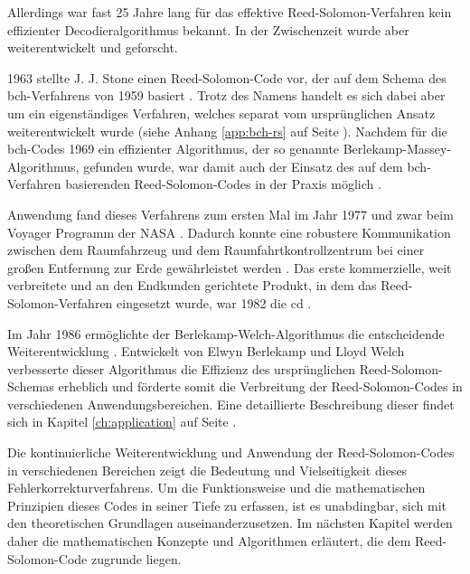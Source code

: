 Allerdings war fast 25 Jahre lang für das effektive Reed-Solomon-Verfahren kein effizienter Decodier\-algorithmus bekannt.
In der Zwischenzeit wurde aber weiterentwickelt und geforscht.

1963 stellte J. J. Stone einen Reed-Solomon-Code vor, der auf dem Schema des \acrfull{bch}-Verfahrens von 1959 basiert \cite{stoneMultipleBurstErrorCorrection1963}.
Trotz des Namens handelt es sich dabei aber um ein eigenständiges Verfahren, welches separat vom ursprünglichen Ansatz weiterentwickelt wurde (siehe Anhang \ref{app:bch-rs} auf Seite \pageref{app:bch-rs}).
Nachdem für die \acrshort{bch}-Codes 1969 ein effizienter Algorithmus, der so genannte Berlekamp-Massey-Algorithmus, gefunden wurde, war damit auch der Einsatz des auf dem \acrshort{bch}-Verfahren basierenden Reed-Solomon-Codes in der Praxis möglich \cite{berlekampNonbinaryBCHDecoding1968, masseyShiftregisterSynthesisBCH1969}.

Anwendung fand dieses Verfahrens zum ersten Mal im Jahr 1977 und zwar beim Voyager Programm der NASA \cite[Kapitel 3.3]{wickerReedSolomonCodes1994}. 
Dadurch konnte eine robustere Kommunikation zwischen dem Raumfahrzeug und dem Raumfahrtkontrollzentrum bei einer großen Entfernung zur Erde gewährleistet werden \cite[Kapitel 6.2]{ludwigVoyagerTelecommunications2002}.
Das erste kommerzielle, weit verbreitete und an den Endkunden gerichtete Produkt, in dem das Reed-Solomon-Verfahren eingesetzt wurde, war 1982 die \acrfull{cd} \cite{changReedSolomonProductCodeRSPC1998}.

Im Jahr 1986 ermöglichte der Berlekamp-Welch-Algorithmus die entscheidende Weiterentwicklung \cite{wendlingIntroductionReedSolomon2017}.
Entwickelt von Elwyn Berlekamp und Lloyd Welch verbesserte dieser Algorithmus die Effizienz des ursprünglichen Reed-Solomon-Schemas erheblich und förderte somit die Verbreitung der Reed-Solomon-Codes in verschiedenen Anwendungsbereichen. 
Eine detaillierte Beschreibung dieser findet sich in Kapitel \ref{ch:application} auf Seite \pageref{ch:application}.

Die kontinuierliche Weiterentwicklung und Anwendung der Reed-Solomon-Codes in verschiedenen Bereichen zeigt die Bedeutung und Vielseitigkeit dieses Fehlerkorrekturverfahrens. 
Um die Funktionsweise und die mathematischen Prinzipien dieses Codes in seiner Tiefe zu erfassen, ist es unabdingbar, sich mit den theoretischen Grundlagen auseinanderzusetzen. 
Im nächsten Kapitel werden daher die mathematischen Konzepte und Algorithmen erläutert, die dem Reed-Solomon-Code zugrunde liegen.